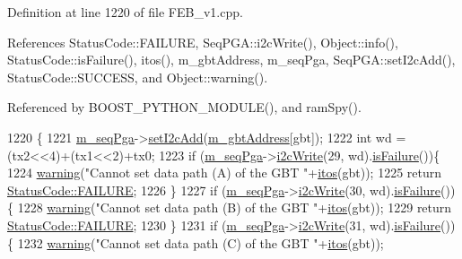 Definition at line 1220 of file F\+E\+B\+\_\+v1.\+cpp.



References Status\+Code\+::\+F\+A\+I\+L\+U\+RE, Seq\+P\+G\+A\+::i2c\+Write(), Object\+::info(), Status\+Code\+::is\+Failure(), itos(), m\+\_\+gbt\+Address, m\+\_\+seq\+Pga, Seq\+P\+G\+A\+::set\+I2c\+Add(), Status\+Code\+::\+S\+U\+C\+C\+E\+SS, and Object\+::warning().



Referenced by B\+O\+O\+S\+T\+\_\+\+P\+Y\+T\+H\+O\+N\+\_\+\+M\+O\+D\+U\+L\+E(), and ram\+Spy().


\begin{DoxyCode}
1220                                                                    \{
1221   \hyperlink{classFEB__v1_a6c7804ac86796f233a8393043adf2e77}{m\_seqPga}->\hyperlink{classSeqPGA_a4ef334e4d2cb417b49033dce951728cd}{setI2cAdd}(\hyperlink{classFEB__v1_ac625855df976f16694178f1a4c0eef1e}{m\_gbtAddress}[gbt]);
1222   \textcolor{keywordtype}{int} wd = (tx2<<4)+(tx1<<2)+tx0; 
1223   \textcolor{keywordflow}{if} (\hyperlink{classFEB__v1_a6c7804ac86796f233a8393043adf2e77}{m\_seqPga}->\hyperlink{classSeqPGA_a429076ca3a4ece94182bd95c623bb9d0}{i2cWrite}(29, wd).\hyperlink{classStatusCode_a5dd22dc6eb2c52fc4cabc58f6dea2eb7}{isFailure}())\{
1224     \hyperlink{classObject_a65cd4fda577711660821fd2cd5a3b4c9}{warning}(\textcolor{stringliteral}{"Cannot set data path (A) of the GBT "}+\hyperlink{Tools_8h_af330027dbdafb9a30768b3613c553e60}{itos}(gbt));
1225     \textcolor{keywordflow}{return} \hyperlink{classStatusCode_a6f565cbeadc76d14c72f047e5e85eb4ba3da73d4c469762eb9d3c960368252b26}{StatusCode::FAILURE};
1226   \}
1227   \textcolor{keywordflow}{if} (\hyperlink{classFEB__v1_a6c7804ac86796f233a8393043adf2e77}{m\_seqPga}->\hyperlink{classSeqPGA_a429076ca3a4ece94182bd95c623bb9d0}{i2cWrite}(30, wd).\hyperlink{classStatusCode_a5dd22dc6eb2c52fc4cabc58f6dea2eb7}{isFailure}())\{
1228     \hyperlink{classObject_a65cd4fda577711660821fd2cd5a3b4c9}{warning}(\textcolor{stringliteral}{"Cannot set data path (B) of the GBT "}+\hyperlink{Tools_8h_af330027dbdafb9a30768b3613c553e60}{itos}(gbt));
1229     \textcolor{keywordflow}{return} \hyperlink{classStatusCode_a6f565cbeadc76d14c72f047e5e85eb4ba3da73d4c469762eb9d3c960368252b26}{StatusCode::FAILURE};
1230   \}
1231   \textcolor{keywordflow}{if} (\hyperlink{classFEB__v1_a6c7804ac86796f233a8393043adf2e77}{m\_seqPga}->\hyperlink{classSeqPGA_a429076ca3a4ece94182bd95c623bb9d0}{i2cWrite}(31, wd).\hyperlink{classStatusCode_a5dd22dc6eb2c52fc4cabc58f6dea2eb7}{isFailure}())\{
1232     \hyperlink{classObject_a65cd4fda577711660821fd2cd5a3b4c9}{warning}(\textcolor{stringliteral}{"Cannot set data path (C) of the GBT "}+\hyperlink{Tools_8h_af330027dbdafb9a30768b3613c553e60}{itos}(gbt));

\end{DoxyCode}
